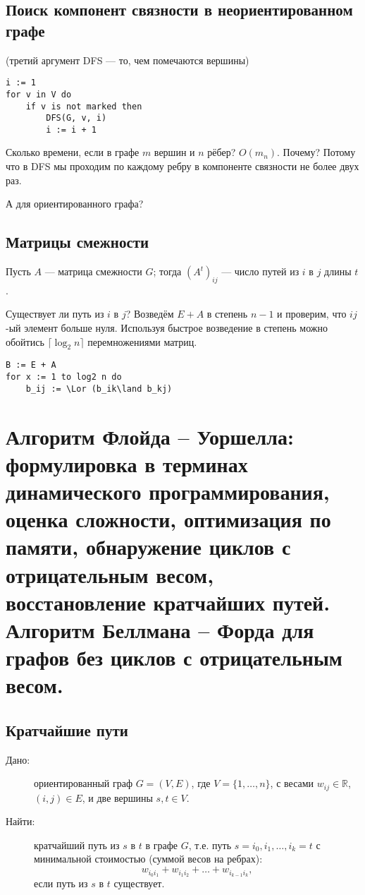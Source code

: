 \documentclass[a4paper,12pt]{article}
\begin{document}
\subsection{Поиск компонент связности в неориентированном графе}
(третий аргумент DFS --- то,  чем помечаются вершины)
\begin{lstlisting}
i := 1
for v in V do
    if v is not marked then
        DFS(G, v, i)
        i := i + 1
\end{lstlisting}

Сколько времени, если в графе $m$ вершин и $n$ рёбер? $O(m_n)$. Почему? Потому что в DFS мы проходим по каждому ребру в компоненте связности не более двух раз.

А для ориентированного графа?



\subsection{Матрицы смежности}
Пусть $A$ --- матрица смежности $G$; тогда $(A^t)_{ij}$ --- число путей из $i$ в $j$ длины $t$.

Существует ли путь из $i$ в $j$? Возведём $E+A$ в степень $n-1$ и проверим, что $ij$-ый элемент больше нуля. Используя быстрое возведение в степень можно обойтись $\lceil\log_2n\rceil$ перемножениями матриц.

\begin{lstlisting}
B := E + A
for x := 1 to log2 n do
    b_ij := \Lor (b_ik\land b_kj)
\end{lstlisting}

\newpage
\section{Алгоритм Флойда – Уоршелла: формулировка в терминах динамического программирования, оценка сложности, оптимизация по памяти, обнаружение циклов с отрицательным весом, восстановление кратчайших путей. Алгоритм Беллмана – Форда для графов без циклов с отрицательным весом.}

\subsection{Кратчайшие пути}
\begin{description}
	\item[Дано:] ориентированный граф $G = (V, E)$, где $V = \{1, \dots, n\}$, с весами $w_{ij}\in\mathbb R$, $(i, j) \in E$, и две вершины $s, t \in V$.
	\item[Найти:] кратчайший путь из $s$ в $t$ в графе $G$, т.е. путь $s = i_0, i_1, \ldots, i_k = t$ с минимальной стоимостью (суммой весов на ребрах):
	\[w_{i_0i_1} + w_{i_1i_2} + \dots + w_{i_{k-1}i_k},\]
	если путь из $s$ в $t$ существует.
\end{description}
\end{document}
